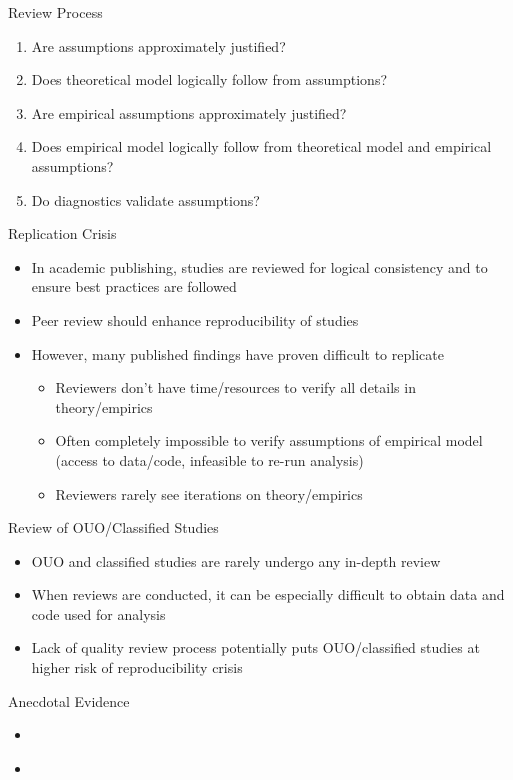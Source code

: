 \documentclass{beamer}
\begin{document}
\begin{frame}{Review Process}
\begin{enumerate}
	\item Are assumptions approximately justified?
	\item Does theoretical model logically follow from assumptions?
	\item Are empirical assumptions approximately justified?
	\item Does empirical model logically follow from theoretical model and empirical assumptions?
	\item Do diagnostics validate assumptions?
\end{enumerate}
\end{frame}

\begin{frame}{Replication Crisis}
\begin{itemize}
	\item In academic publishing, studies are reviewed for logical consistency and to ensure best practices are followed
	\item Peer review should enhance reproducibility of studies
	\item However, many published findings have proven difficult to replicate
		\begin{itemize}
			\item Reviewers don't have time/resources to verify all details in theory/empirics
			\item Often completely impossible to verify assumptions of empirical model (access to data/code, infeasible to re-run analysis)
			\item Reviewers rarely see iterations on theory/empirics
		\end{itemize}
\end{itemize}
\end{frame}

\begin{frame}{Review of OUO/Classified Studies}
\begin{itemize}
	\item OUO and classified studies are rarely undergo any in-depth review
	\item When reviews are conducted, it can be especially difficult to obtain data and code used for analysis
	\item Lack of quality review process potentially puts OUO/classified studies at higher risk of reproducibility crisis
\end{itemize}
\end{frame}

\begin{frame}{Anecdotal Evidence}
\begin{itemize}
	\item 
\end{itemize}
\end{frame}

\begin{frame}{}
\begin{itemize}
	\item 
\end{itemize}
\end{frame}
\end{document}
